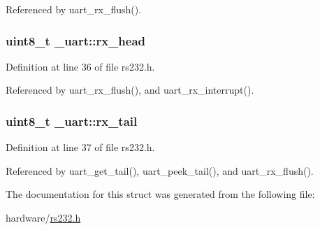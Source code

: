 Referenced by uart\+\_\+rx\+\_\+flush().

\subsubsection[{\texorpdfstring{rx\+\_\+head}{rx_head}}]{\setlength{\rightskip}{0pt plus 5cm}uint8\+\_\+t \+\_\+uart\+::rx\+\_\+head}\hypertarget{struct__uart_add14728bfbde14b7c260c8ff09bcd91b}{}\label{struct__uart_add14728bfbde14b7c260c8ff09bcd91b}


Definition at line 36 of file rs232.\+h.



Referenced by uart\+\_\+rx\+\_\+flush(), and uart\+\_\+rx\+\_\+interrupt().

\subsubsection[{\texorpdfstring{rx\+\_\+tail}{rx_tail}}]{\setlength{\rightskip}{0pt plus 5cm}uint8\+\_\+t \+\_\+uart\+::rx\+\_\+tail}\hypertarget{struct__uart_a4bd6a544526fe5ac94a5f9af09e3bbeb}{}\label{struct__uart_a4bd6a544526fe5ac94a5f9af09e3bbeb}


Definition at line 37 of file rs232.\+h.



Referenced by uart\+\_\+get\+\_\+tail(), uart\+\_\+peek\+\_\+tail(), and uart\+\_\+rx\+\_\+flush().



The documentation for this struct was generated from the following file\+:\begin{DoxyCompactItemize}
\item 
hardware/\hyperlink{rs232_8h}{rs232.\+h}\end{DoxyCompactItemize}
